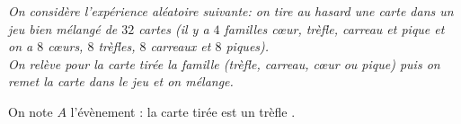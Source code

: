 \documentclass[10pt]{article}
\begin{document}
\setlength\parindent{0mm}
\pagestyle{fancy}
\thispagestyle{empty}
    
    
    




\medskip

\emph{On considère l'expérience aléatoire suivante: on tire au hasard une carte dans un jeu bien mélangé de $32$ cartes (il y a $4$ \og familles \fg{} cœur, trèfle, carreau et pique et on a $8$ cœurs, $8$ trèfles, $8$ carreaux et $8$ piques).\\
On relève pour la carte tirée la \og famille \fg{} (trèfle, carreau, cœur ou pique) puis on remet la carte dans le jeu et on mélange.}
 
On note $A$ l'évènement : \og la carte tirée est un trèfle \fg.

\medskip
\end{document}
